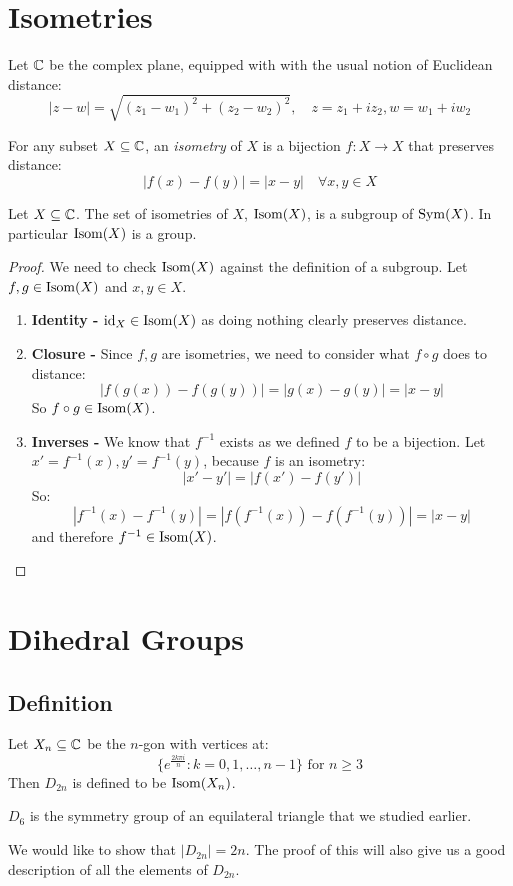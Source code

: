 \documentclass[../main.tex]{subfiles}
\begin{document}
\section{Isometries}
Let $\mathbb{C}$ be the complex plane, equipped with with the usual notion of Euclidean distance:
\[
   |z-w| = \sqrt{(z_1 - w_1)^2 + (z_2 - w_2)^2}, \quad z = z_1 + i z_2, w = w_1 + i w_2
\]
\begin{definition}[Isometry]
  For any subset $X \subseteq \mathbb{C}$, an \textit{isometry} of $X$ is a bijection $f: X \to X$ that preserves distance:
  \[
    |f(x) - f(y)| = |x - y| \quad \forall x, y \in X
  \]
\end{definition}
\begin{proposition}
  Let $X \subseteq \mathbb{C}$.
  The set of isometries of $X$, $\operatorname{Isom}(X)$, is a subgroup of $\operatorname{Sym}(X)$.
  In particular $\operatorname{Isom}(X)$ is a group. \label{isomProof}
\end{proposition}
\begin{proof}
  We need to check $\operatorname{Isom}(X)$ against  the definition of a subgroup.
  Let $f, g \in \operatorname{Isom}(X)$ and $x, y \in X$.
  \begin{enumerate}
    \item \textbf{Identity -} $\mathrm{id}_X \in \operatorname{Isom}(X)$ as doing nothing clearly preserves distance.
    \item \textbf{Closure -} Since $f, g$ are isometries, we need to consider what $f \circ g$ does to distance:
      \[
        |f(g(x)) - f(g(y))| = |g(x) - g(y)| = |x - y|
      \]
      So $f \circ g \in \operatorname{Isom}(X)$.
    \item \textbf{Inverses -} We know that $f^{-1}$ exists as we defined $f$ to be a bijection.
      Let $x' = f^{-1}(x), y' = f^{-1}(y)$, because $f$ is an isometry:
      \[
        |x' - y'| = |f(x') - f(y')|
      \]
      So:
      \[
        |f^{-1}(x) - f^{-1}(y)| = |f(f^{-1}(x)) - f(f^{-1}(y))| = |x - y|
      \]
      and therefore $f^{-1} \in \operatorname{Isom}(X)$.
  \end{enumerate}
\end{proof}
\section{Dihedral Groups}
\subsection{Definition}
\begin{definition}
  Let $X_n \subseteq \mathbb{C}$ be the $n$-gon with vertices at:
  \[
    \{e^{\frac{2k\pi i}{n}}: k = 0, 1, \ldots, n-1\} \text{ for } n \geq3
  \]
  Then $D_{2n}$ is defined to be $\operatorname{Isom}(X_n)$.
\end{definition}
\begin{example}
  $D_6$ is the symmetry group of an equilateral triangle that we studied earlier.
\end{example}
We would like to show that $|D_{2n}| = 2n$.
The proof of this will also give us a good description of all the elements of $D_{2n}$.
\end{document}
